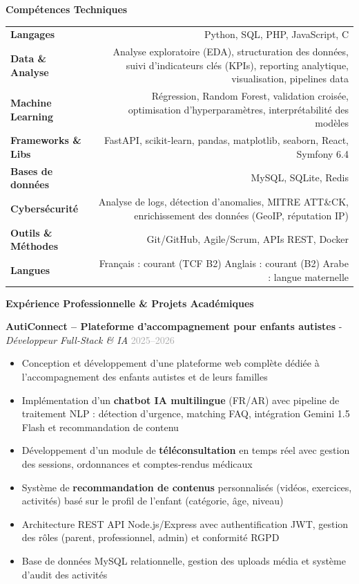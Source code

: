 \documentclass[10pt,a4paper]{article}
\newcommand{\cvsection}[1]{
    \vspace{0.3cm}
    \noindent\colorbox{sectiongray}{%
        \parbox{\dimexpr\textwidth-2\fboxsep\relax}{%
            \textcolor{mainblue}{\large\textbf{#1}}%
        }%
    }
    \vspace{0.15cm}
}
\newcommand{\cventry}[3]{
    \noindent\textbf{\textcolor{mainblue}{#1}} - \textit{#2} \hfill \textcolor{darkgray}{#3}
}
\begin{document}
\cvsection{Compétences Techniques}

\begin{tabular}{@{}L!{\color{lightgray}\vrule width 1.5pt}R@{}}
\textbf{Langages} &
Python, SQL, PHP, JavaScript, C\\[0.2cm]

\textbf{Data \& Analyse} &
Analyse exploratoire (EDA), structuration des données, suivi d’indicateurs clés (KPIs),
reporting analytique, visualisation, pipelines data\\[0.2cm]

\textbf{Machine Learning} &
Régression, Random Forest, validation croisée, optimisation d’hyperparamètres,
interprétabilité des modèles\\[0.2cm]

\textbf{Frameworks \& Libs} &
FastAPI, scikit-learn, pandas, matplotlib, seaborn, React, Symfony 6.4\\[0.2cm]

\textbf{Bases de données} &
MySQL, SQLite, Redis\\[0.2cm]

\textbf{Cybersécurité} &
Analyse de logs, détection d’anomalies, MITRE ATT\&CK,
enrichissement des données (GeoIP, réputation IP)\\[0.2cm]

\textbf{Outils \& Méthodes} &
Git/GitHub, Agile/Scrum, APIs REST, Docker\\[0.2cm]

\textbf{Langues} &
Français : courant (TCF B2) \textbullet{}
Anglais : courant (B2) \textbullet{}
Arabe : langue maternelle
\end{tabular}

\cvsection{Expérience Professionnelle \& Projets Académiques}

\cventry{AutiConnect – Plateforme d'accompagnement pour enfants autistes}{Développeur Full-Stack \& IA}{2025–2026}
\begin{itemize}
\item Conception et développement d'une plateforme web complète dédiée à l'accompagnement des enfants autistes et de leurs familles
\item Implémentation d'un \textbf{chatbot IA multilingue} (FR/AR) avec pipeline de traitement NLP : détection d'urgence, matching FAQ, intégration Gemini 1.5 Flash et recommandation de contenu
\item Développement d'un module de \textbf{téléconsultation} en temps réel avec gestion des sessions, ordonnances et comptes-rendus médicaux
\item Système de \textbf{recommandation de contenus} personnalisés (vidéos, exercices, activités) basé sur le profil de l'enfant (catégorie, âge, niveau)
\item Architecture REST API Node.js/Express avec authentification JWT, gestion des rôles (parent, professionnel, admin) et conformité RGPD
\item Base de données MySQL relationnelle, gestion des uploads média et système d'audit des activités
\end{itemize}
\end{document}
